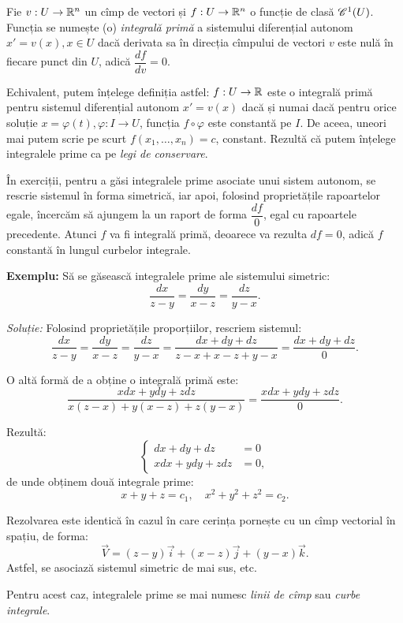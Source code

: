 \begin{definition}\label{def:int-prim}
  Fie $ v : U \to \mathbb{R}^n $ un cîmp de vectori și $ f : U \to \mathbb{R}^n $ o funcție
  de clasă $ \mathscr{C}^1(U) $. Funcția se numește (o) \emph{integrală primă} a
  sistemului diferențial autonom $ x' = v(x), x \in U $ dacă derivata sa
  în direcția cîmpului de vectori $ v $ este nulă în fiecare punct din
  $ U $, adică $ \dfrac{df}{dv} = 0 $.
\end{definition}

Echivalent, putem înțelege definiția astfel: $ f : U \to \mathbb{R} $ este o
integrală primă pentru sistemul diferențial autonom $ x' = v(x) $ dacă
și numai dacă pentru orice soluție $ x = \varphi(t), \varphi : I \to U $,
funcția $ f \circ \varphi $ este constantă pe $ I $. De aceea, uneori
mai putem scrie pe scurt $ f(x_1, \dots, x_n) = c $, constant. Rezultă
că putem înțelege integralele prime ca pe \emph{legi de conservare}.

În exerciții, pentru a găsi integralele prime asociate unui sistem autonom,
se rescrie sistemul în forma simetrică, iar apoi, folosind proprietățile rapoartelor
egale, încercăm să ajungem la un raport de forma $ \dfrac{df}{0} $, egal cu
rapoartele precedente. Atunci $ f $ va fi integrală primă, deoarece va
rezulta $ df = 0 $, adică $ f $ constantă în lungul curbelor integrale.

\textbf{Exemplu:} Să se găsească integralele prime ale sistemului simetric:
\[
  \dfrac{dx}{z - y} = \dfrac{dy}{x - z} = \dfrac{dz}{y - x}.
\]

\emph{Soluție:} Folosind proprietățile proporțiilor, rescriem sistemul:
\[
  \dfrac{dx}{z - y} = \dfrac{dy}{x - z} = \dfrac{dz}{y - x} = %
  \dfrac{dx + dy + dz}{z - x + x - z + y - x} = %
  \dfrac{dx + dy + dz}{0}.
\]

O altă formă de a obține o integrală primă este:
\[
  \dfrac{xdx + ydy + zdz}{x(z - x) + y(x - z) + z(y - x)} = %
  \dfrac{xdx + ydy + zdz}{0}.
\]

Rezultă:
\[
  \begin{cases}
    dx + dy + dz &= 0 \\
    xdx + ydy + zdz &= 0,
  \end{cases}
\]
de unde obținem două integrale prime:
\[
  x + y + z = c_1, \quad x^2 + y^2 + z^2 = c_2.
\]

\begin{remark}\label{rk:sist-cimp}
  Rezolvarea este identică în cazul în care cerința pornește cu un
  cîmp vectorial în spațiu, de forma:
  \[
    \vec{V} = (z - y)\vec{i} + (x - z)\vec{j} + (y - x) \vec{k}.
  \]
  Astfel, se asociază sistemul simetric de mai sus, etc.

  Pentru acest caz, integralele prime se mai numesc \emph{linii de cîmp}
  sau \emph{curbe integrale}.
\end{remark}


